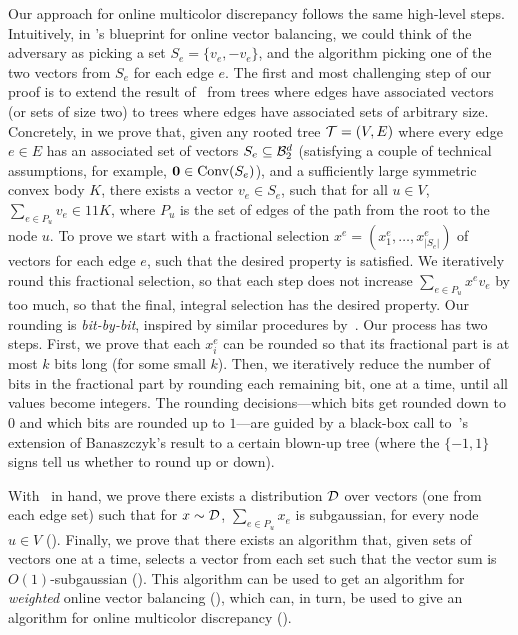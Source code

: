 Our approach for online multicolor discrepancy follows the same high-level steps. Intuitively, in \citet{kulkarni2024optimal}'s blueprint for online vector balancing, we could think of the adversary as picking a set $S_e = \{ v_e, - v_e \}$, and the algorithm picking one of the two vectors from $S_e$ for each edge $e$. The first and most challenging step of our proof is to extend the result of~\cite{kulkarni2024optimal} from trees where edges have associated vectors (or sets of size two) to trees where edges have associated sets of arbitrary size. Concretely, in  we prove that, given any rooted tree $\mathcal{T} = (V,E)$ where every edge $e \in E$ has an associated set of vectors $S_e \subseteq \mathcal{B}^d_2$ (satisfying a couple of technical assumptions, for example, $\mathbf{0} \in \mathrm{Conv}(S_e)$), and a sufficiently large symmetric convex body $K$, there exists a vector $v_e \in S_e$, such that for all $u \in V$, $\sum_{e \in P_u} v_e \in 11 K$, where $P_u$ is the set of edges of the path from the root to the node $u$. To prove  we start with a fractional selection $x^e = (x^e_1, \dots, x^e_{|S_e|})$ of vectors for each edge $e$, such that the desired property is satisfied. We iteratively round this fractional selection, so that each step does not increase $\sum_{e \in P_u} x^e v_e$ by too much, so that the final, integral selection has the desired property. Our rounding is \emph{bit-by-bit}, inspired by similar procedures by~\cite{bansal2022prefix,lovasz1986discrepancy}. Our process has two steps. First, we prove that each $x^e_i$ can be rounded so that its fractional part is at most $k$ bits long (for some small $k$). Then, we iteratively reduce the number of bits in the fractional part by rounding each remaining bit, one at a time, until all values become integers. The rounding decisions---which bits get rounded down to $0$ and which bits are rounded up to $1$---are guided by a black-box call to~\cite{kulkarni2024optimal}'s extension of Banaszczyk's result to a certain blown-up tree (where the $\{-1,1\}$ signs tell us whether to round up or down).

With~ in hand, we prove there exists a distribution $\mathcal{D}$ over vectors (one from each edge set) such that for $x \sim \mathcal{D}$, $\sum_{e \in P_u} x_e$ is subgaussian, for every node $u \in V$ (). Finally, we prove that there exists an algorithm that, given sets of vectors one at a time, selects a vector from each set such that the vector sum is $O(1)$-subgaussian (). This algorithm can be used to get an algorithm for \emph{weighted} online vector balancing (), which can, in turn, be used to give an algorithm for online multicolor discrepancy ().

